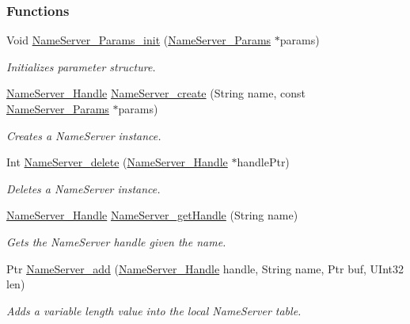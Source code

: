 \subsubsection*{Functions}
\begin{DoxyCompactItemize}
\item 
Void \hyperlink{_name_server_8h_a9bb546e8a7d656ce5e919650febe4989}{NameServer\_\-Params\_\-init} (\hyperlink{struct_name_server___params}{NameServer\_\-Params} $\ast$params)
\begin{DoxyCompactList}\small\item\em Initializes parameter structure. \item\end{DoxyCompactList}\item 
\hyperlink{_name_server_8h_a99fa93c4ee4169db90162b523d9152d4}{NameServer\_\-Handle} \hyperlink{_name_server_8h_a7345e78debfbf6d5da6ae1603764429a}{NameServer\_\-create} (String name, const \hyperlink{struct_name_server___params}{NameServer\_\-Params} $\ast$params)
\begin{DoxyCompactList}\small\item\em Creates a NameServer instance. \item\end{DoxyCompactList}\item 
Int \hyperlink{_name_server_8h_a3419fc2bf3e6c34289c620cf9be38a04}{NameServer\_\-delete} (\hyperlink{_name_server_8h_a99fa93c4ee4169db90162b523d9152d4}{NameServer\_\-Handle} $\ast$handlePtr)
\begin{DoxyCompactList}\small\item\em Deletes a NameServer instance. \item\end{DoxyCompactList}\item 
\hyperlink{_name_server_8h_a99fa93c4ee4169db90162b523d9152d4}{NameServer\_\-Handle} \hyperlink{_name_server_8h_abaebe428fbf536448c99acb6faf25134}{NameServer\_\-getHandle} (String name)
\begin{DoxyCompactList}\small\item\em Gets the NameServer handle given the name. \item\end{DoxyCompactList}\item 
Ptr \hyperlink{_name_server_8h_ad7d45ed8fe5bcd1f10da5914c8da39f5}{NameServer\_\-add} (\hyperlink{_name_server_8h_a99fa93c4ee4169db90162b523d9152d4}{NameServer\_\-Handle} handle, String name, Ptr buf, UInt32 len)
\begin{DoxyCompactList}\small\item\em Adds a variable length value into the local NameServer table. \item\end{DoxyCompactList}\item 

\end{DoxyCompactItemize}
